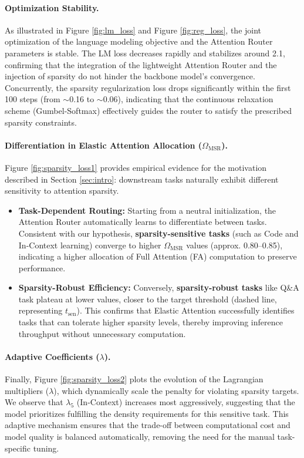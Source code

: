 \paragraph{Optimization Stability.}As illustrated in Figure \ref{fig:lm_loss} and Figure \ref{fig:reg_loss}, the joint optimization of the language modeling objective and the Attention Router parameters is stable.
The LM loss decreases rapidly and stabilizes around 2.1, confirming that the integration of the lightweight Attention Router and the injection of sparsity do not hinder the backbone model's convergence. 
Concurrently, the sparsity regularization loss drops significantly within the first 100 steps (from $\sim$0.16 to $\sim$0.06), indicating that the continuous relaxation scheme (Gumbel-Softmax) effectively guides the router to satisfy the prescribed sparsity constraints.
\paragraph{Differentiation in Elastic Attention Allocation ($\Omega_{\mathrm{MSR}}$).}
Figure \ref{fig:sparsity_loss1} provides empirical evidence for the motivation described in Section \ref{sec:intro}: downstream tasks naturally exhibit different sensitivity to attention sparsity.
\begin{itemize}
\item \textbf{Task-Dependent Routing:} Starting from a neutral initialization, the Attention Router automatically learns to differentiate between tasks. Consistent with our hypothesis, \textbf{sparsity-sensitive tasks} (such as Code and In-Context learning) converge to higher $\Omega_{\mathrm{MSR}}$ values (approx. 0.80--0.85), indicating a higher allocation of Full Attention (FA) computation to preserve performance.
\item \textbf{Sparsity-Robust Efficiency:} Conversely, \textbf{sparsity-robust tasks} like Q\&A task plateau at lower values, closer to the target threshold (dashed line, representing $t_{\mathrm{sen}}$). This confirms that Elastic Attention successfully identifies tasks that can tolerate higher sparsity levels, thereby improving inference throughput without unnecessary computation.\end{itemize}
\paragraph{Adaptive Coefficients ($\lambda$).}Finally, Figure \ref{fig:sparsity_loss2} plots the evolution of the Lagrangian multipliers ($\lambda$), which dynamically scale the penalty for violating sparsity targets. 
We observe that $\lambda_5$ (In-Context) increases most aggressively, suggesting that the model prioritizes fulfilling the density requirements for this sensitive task. This adaptive mechanism ensures that the trade-off between computational cost and model quality is balanced automatically, removing the need for the manual task-specific tuning.


